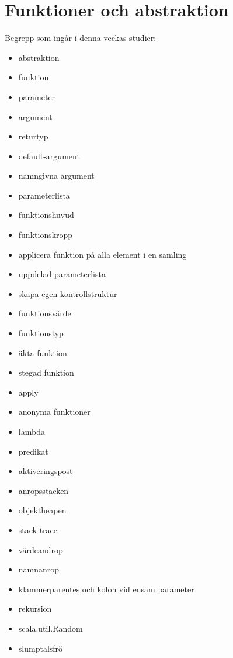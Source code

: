 \chapter{Funktioner och abstraktion}\label{chapter:W03}
Begrepp som ingår i denna veckas studier:
\begin{multicols}{2}\begin{itemize}[noitemsep,label={$\square$},leftmargin=*]
\item abstraktion
\item funktion
\item parameter
\item argument
\item returtyp
\item default-argument
\item namngivna argument
\item parameterlista
\item funktionshuvud
\item funktionskropp
\item applicera funktion på alla element i en samling
\item uppdelad parameterlista
\item skapa egen kontrollstruktur
\item funktionsvärde
\item funktionstyp
\item äkta funktion
\item stegad funktion
\item apply
\item anonyma funktioner
\item lambda
\item predikat
\item aktiveringspost
\item anropsstacken
\item objektheapen
\item stack trace
\item värdeandrop
\item namnanrop
\item klammerparentes och kolon vid ensam parameter
\item rekursion
\item scala.util.Random
\item slumptalsfrö\end{itemize}\end{multicols}
